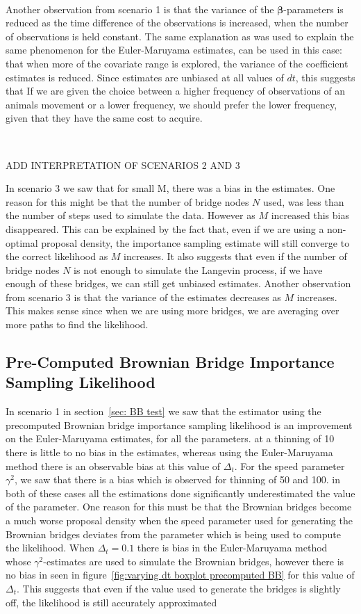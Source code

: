 \

Another observation from scenario 1 is that the variance of the $\bm \beta$-parameters is reduced as the time difference of the observations is increased, when the number of observations is held constant. The same explanation as was used to explain the same phenomenon for the Euler-Maruyama estimates, can be used in this case: that when more of the covariate range is explored, the variance of the coefficient estimates is reduced. Since estimates are unbiased at all values of $dt$, this suggests that If we are given the choice between a higher frequency of observations of an animals movement or a lower frequency, we should prefer the lower frequency, given that they have the same cost to acquire.

\


ADD INTERPRETATION OF SCENARIOS 2 AND 3


In scenario 3 we saw that for small M, there was a bias in the estimates. One reason for this might be that the number of bridge nodes $N$ used, was less than the number of steps used to simulate the data. However as $M$ increased this bias disappeared. This can be explained by the fact that, even if we are using a non-optimal proposal density, the importance sampling estimate will still converge to the correct likelihood as $M$ increases. It also suggests that even if the number of bridge nodes $N$ is not enough to simulate the Langevin process, if we have enough of these bridges, we can still get unbiased estimates. Another observation from scenario 3 is that the variance of the estimates decreases as $M$ increases. This makes sense since when we are using more bridges, we are averaging over more paths to find the likelihood.

\subsection{Pre-Computed Brownian Bridge Importance Sampling Likelihood}

In scenario 1 in section~\ref{sec: BB test} we saw that the estimator using the precomputed Brownian bridge importance sampling likelihood is an improvement on the Euler-Maruyama estimates, for all the parameters. at a thinning of 10 there is little to no bias in the estimates, whereas using the Euler-Maruyama method there is an observable bias at this value of $\Delta_t$. For the speed parameter $\gamma^2$, we saw that there is a bias which is observed for thinning of 50 and 100. in both of these cases all the estimations done significantly underestimated the value of the parameter. One reason for this must be that the Brownian bridges become a much worse proposal density when the speed parameter used for generating the Brownian bridges deviates from the parameter which is being used to compute the likelihood. 
When $\Delta_t=0.1$ there is bias in the Euler-Maruyama method whose $\gamma^2$-estimates are used to simulate the Brownian bridges, however there is no bias in seen in figure~\ref{fig:varying dt boxplot precomputed BB} for this value of $\Delta_t$. This suggests that even if the value used to generate the bridges is slightly off, the likelihood is still accurately approximated


